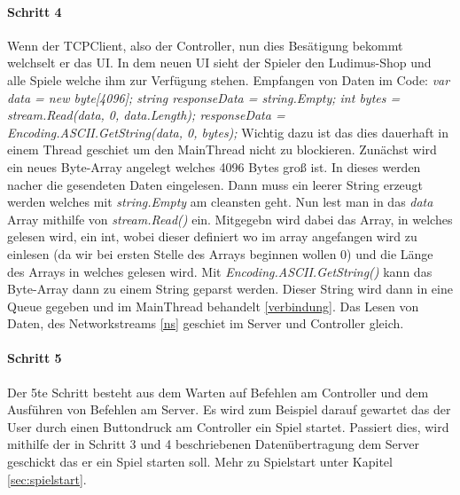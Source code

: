 \paragraph{Schritt 4}
Wenn der TCPClient, also der Controller, nun dies Besätigung bekommt welchselt er das UI. In dem neuen UI sieht der Spieler den Ludimus-Shop und alle Spiele welche ihm zur Verfügung stehen.
Empfangen von Daten im Code: \newline
\textit{ 
var data = new byte[4096];\newline
string responseData = string.Empty;\newline
int bytes = stream.Read(data, 0, data.Length); \newline
responseData = Encoding.ASCII.GetString(data, 0, bytes); \newline}
Wichtig dazu ist das dies dauerhaft in einem Thread geschiet um den MainThread nicht zu blockieren.
Zunächst wird ein neues Byte-Array angelegt welches 4096 Bytes groß ist. In dieses werden nacher die gesendeten Daten eingelesen.
Dann muss ein leerer String erzeugt werden welches mit \textit{string.Empty} am cleansten geht. 
Nun lest man in das \textit{data} Array mithilfe von \textit{stream.Read()} ein. 
Mitgegebn wird dabei das Array, in welches gelesen wird, ein int, wobei dieser definiert wo im array angefangen wird zu einlesen (da wir bei ersten Stelle des Arrays beginnen wollen 0) und die Länge des Arrays in welches gelesen wird.
Mit \textit{Encoding.ASCII.GetString()} kann das Byte-Array dann zu einem String geparst werden. 
Dieser String wird dann in eine Queue gegeben und im MainThread behandelt \ref{verbindung}. 
Das Lesen von Daten, des Networkstreams \ref{ns} geschiet im Server und Controller gleich.
\paragraph{Schritt 5}
Der 5te Schritt besteht aus dem Warten auf Befehlen am Controller und dem Ausführen von Befehlen am Server.
Es wird zum Beispiel darauf gewartet das der User durch einen Buttondruck am Controller ein Spiel startet.
Passiert dies, wird mithilfe der in Schritt 3 und 4 beschriebenen Datenübertragung dem Server geschickt das er ein Spiel starten soll.
Mehr zu Spielstart unter Kapitel \ref{sec:spielstart}.